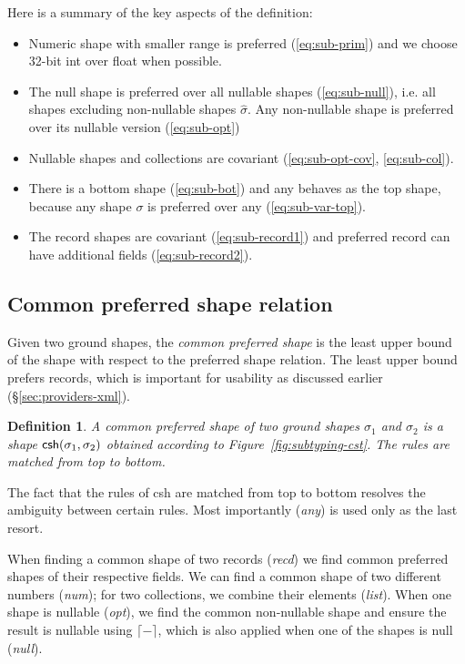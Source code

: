 \documentclass[10pt,nocopyrightspace]{sigplanconf}
\newcommand{\kvd}[1]{\textnormal{\textcolor{kvdclr}{\sffamily #1}}}
\newcommand{\ident}[1]{\textnormal{\sffamily #1}}
\newcommand{\addopt}[1]{\lceil#1\rceil}
\newtheorem{definition}{Definition}
\begin{document}
\noindent
Here is a summary of the key aspects of the definition:
\begin{itemize}
\item Numeric shape with smaller range is preferred (\ref{eq:sub-prim}) and we choose 32-bit
\ident{int} over \ident{float} when possible.

\item The \kvd{null} shape is preferred over all nullable shapes (\ref{eq:sub-null}), i.e.
  all shapes excluding non-nullable shapes $\hat{\sigma}$. Any non-nullable shape is preferred
  over its nullable version (\ref{eq:sub-opt})

\item Nullable shapes and collections are
  covariant (\ref{eq:sub-opt-cov}, \ref{eq:sub-col}).

\item There is a bottom shape (\ref{eq:sub-bot}) and \kvd{any} behaves as the top shape, because
  any shape $\sigma$ is preferred over \kvd{any} (\ref{eq:sub-var-top}).

\item The record shapes are covariant (\ref{eq:sub-record1}) and preferred record can have
  additional fields (\ref{eq:sub-record2}).
\end{itemize}

\noindent



\subsection{Common preferred shape relation}
\label{sec:inference-commonsuper}

Given two ground shapes, the \emph{common preferred shape} is the least upper bound of the
shape with respect to the preferred shape relation. The least upper bound prefers records,
which is important for usability as discussed earlier (\S\ref{sec:providers-xml}).
\begin{definition}
A \emph{common preferred shape} of two ground shapes $\sigma_1$ and $\sigma_2$ is a shape
$\ident{csh}(\sigma_1, \sigma_2)$ obtained according to Figure~\ref{fig:subtyping-cst}.
The rules are matched from top to bottom.
\end{definition}

\noindent
The fact that the rules of \ident{csh} are matched from top to bottom resolves the ambiguity
between certain rules. Most importantly (\emph{any}) is used only as the last resort.

When finding a common shape of two records (\emph{recd}) we find common preferred shapes of their
respective fields. We can find a common shape of two different numbers (\emph{num}); for two collections,
we combine their elements (\emph{list}). When one shape is nullable (\emph{opt}), we find
the common non-nullable shape and ensure the result is nullable using $\addopt{-}$, which
is also applied when one of the shapes is \kvd{null} (\emph{null}).
\end{document}
